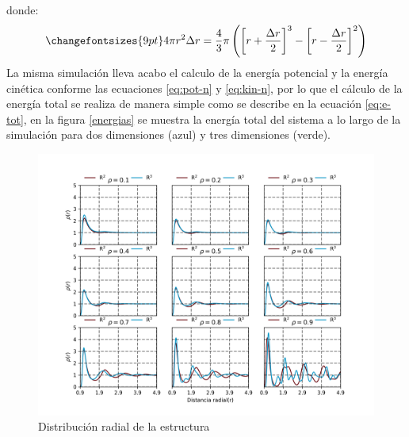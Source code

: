 \documentclass[reprint,amsmath,amssymb,aps,]{revtex4-2}
\begin{document}
donde:
\begin{equation}
    \changefontsizes{9pt}
    \label{eq:volumen}
   4 \pi r^2 \Delta r =\frac{4}{3} \pi \left(\left[r +\frac{\Delta r}{2}\right]^3 - \left[r- \frac{\Delta r}{2} \right]^2 \right)
\end{equation}
La misma simulación lleva acabo el calculo de la energía potencial y la energía cinética conforme las ecuaciones \ref{eq:pot-n} y \ref{eq:kin-n}, por lo que el cálculo de la energía total se realiza de manera simple como se describe en la ecuación \ref{eq:e-tot}, en la figura \ref{energias} se muestra la energía total del sistema a lo largo de la simulación para dos dimensiones (azul) y tres dimensiones (verde).
\begin{figure}
    \centering
    \includegraphics[scale=0.65]{../Graphics/Dis_rad.png}
    \caption{Distribución radial de la estructura}
    \label{distribución radial}
\end{figure}
\end{document}
